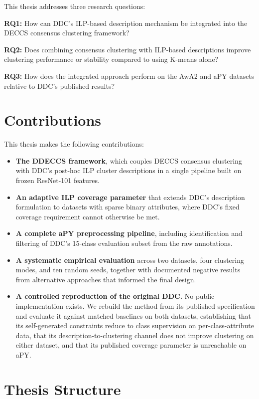 This thesis addresses three research questions:

\textbf{RQ1:} How can DDC's ILP-based description mechanism be integrated into the DECCS consensus clustering framework?

\textbf{RQ2:} Does combining consensus clustering with ILP-based descriptions improve clustering performance or stability compared to using K-means alone?

\textbf{RQ3:} How does the integrated approach perform on the AwA2 and aPY datasets relative to DDC's published results?

\section{Contributions}

This thesis makes the following contributions:

\begin{itemize}
    \item \textbf{The DDECCS framework}, which couples DECCS consensus clustering with DDC's post-hoc ILP cluster descriptions in a single pipeline built on frozen ResNet-101 features.
    \item \textbf{An adaptive ILP coverage parameter} that extends DDC's description formulation to datasets with sparse binary attributes, where DDC's fixed coverage requirement cannot otherwise be met.
    \item \textbf{A complete aPY preprocessing pipeline}, including identification and filtering of DDC's 15-class evaluation subset from the raw annotations.
    \item \textbf{A systematic empirical evaluation} across two datasets, four clustering modes, and ten random seeds, together with documented negative results from alternative approaches that informed the final design.
    \item \textbf{A controlled reproduction of the original DDC.} No public implementation exists. We rebuild the method from its published specification and evaluate it against matched baselines on both datasets, establishing that its self-generated constraints reduce to class supervision on per-class-attribute data, that its description-to-clustering channel does not improve clustering on either dataset, and that its published coverage parameter is unreachable on aPY.
\end{itemize}

\section{Thesis Structure}

